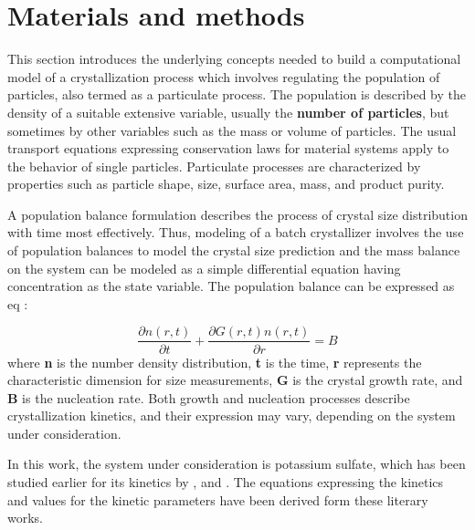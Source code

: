 \documentclass[3p,times,authoryear]{elsarticle}
\begin{document}
\section{Materials and methods} \label{model}


This section introduces the underlying concepts needed to build a computational model of a crystallization process which involves regulating the population of particles, also termed as a particulate process. 
The population is described by the density of a suitable extensive variable, usually the \textbf{number of particles}, but sometimes by other variables such as the mass or volume of particles. The usual transport equations expressing conservation laws for material systems apply to the behavior of single particles. Particulate processes are characterized by properties such as particle shape, size, surface area, mass, and product purity. \par
A population balance formulation describes the process of crystal size distribution with time most effectively. Thus, modeling of a batch crystallizer involves the use of population balances to model the crystal size prediction and the mass balance on the system can be modeled as a simple differential equation having concentration as the state variable.
The population balance can be expressed as eq :

\begin{equation} \label{populationbalance}
\frac{\partial{n(r,t)}}{\partial{t}} + \frac{\partial{G(r,t)n(r,t)}}{\partial{r}} = B  
\end{equation}
where \textbf{n} is the number density distribution, \textbf{t} is the time, \textbf{r} represents the characteristic dimension for size measurements, \textbf{G} is the crystal growth rate, and \textbf{B} is the nucleation rate. Both growth and nucleation processes describe crystallization kinetics, and their expression may vary, depending on the system under consideration.

In this work, the system under consideration is potassium sulfate, which has been studied earlier for its kinetics by \cite{hu}, \cite{shi} and \cite{paeng}. The equations expressing the kinetics and values for the kinetic parameters have been derived form these literary works. 
\end{document}
